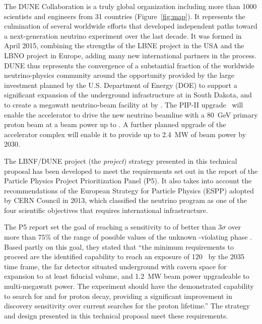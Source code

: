 The DUNE Collaboration is a truly global organization including more than \num{1000} scientists and engineers from \num{31} countries (Figure~\ref{fig:map}). It represents
the culmination of several worldwide efforts that developed independent paths toward a next-generation  neutrino experiment over the last decade.
It was formed in April 2015, combining the strengths of the LBNE project in the USA and the LBNO project in Europe, adding many new international 
partners in the process. DUNE thus represents the convergence of a substantial fraction of the worldwide neutrino-physics community around the 
opportunity provided by the large investment planned by the U.S. Department of Energy (DOE) to support 
a significant expansion of the underground infrastructure at \surf in South Dakota, and to create a megawatt neutrino-beam facility at  \fnal by \beamturnon{}. 
The PIP-II upgrade~\cite{pip2-2013}
will enable the accelerator to drive the new neutrino beamline with %
a \SI{80}{\GeV} primary proton beam at a beam power %
up to \pipiibeampower{}. A further planned upgrade 
of the accelerator complex will enable it to provide up to \SI{2.4}{\MW} of beam power by 2030. 

The LBNF/DUNE project (the \textit{project}) strategy presented in this technical proposal has been developed to meet the requirements set out in the report of the Particle Physics Project Prioritization Panel (P5). It also takes into account the recommendations of the European Strategy for Particle  Physics (ESPP) adopted by CERN Council in 2013, which classified the  neutrino program as one of the four scientific objectives that requires international infrastructure.

The P5 report set the goal of reaching a sensitivity to  of better than \num{3}$\sigma$ over more than $75\%$ 
of the range of possible values of the unknown -violating phase \deltacp.
Based partly on this goal, they stated that ``the 
minimum requirements to proceed are the identified capability to reach an exposure 
of \num{120}~\ktMWyr{} by the 2035 time frame, the far detector situated underground 
with cavern space for expansion to at least \fdfiducialmass \lar fiducial volume, and \SI{1.2}{MW} 
beam power upgradeable to multi-megawatt power.
The experiment should have the demonstrated 
capability to search for  and for proton decay, providing a significant 
improvement in discovery sensitivity over current searches for the proton lifetime.'' The strategy and design presented in this technical proposal meet these requirements.



